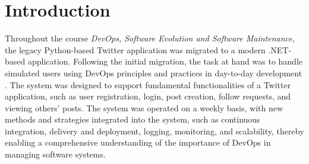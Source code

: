 \chapter{Introduction}

Throughout the course \textit{DevOps, Software Evolution and Software Maintenance}, the legacy Python-based Twitter application was migrated to a modern .NET-based application. Following the initial migration, the task at hand was to handle simulated users using DevOps principles and practices in day-to-day development \cite{kim2016devops}. The system was designed to support fundamental functionalities of a Twitter application, such as user registration, login, post creation, follow requests, and viewing others' posts. The system was operated on a weekly basis, with new methods and strategies integrated into the system, such as continuous integration, delivery and deployment, logging, monitoring, and scalability, thereby enabling a comprehensive understanding of the importance of DevOps in managing software systems.